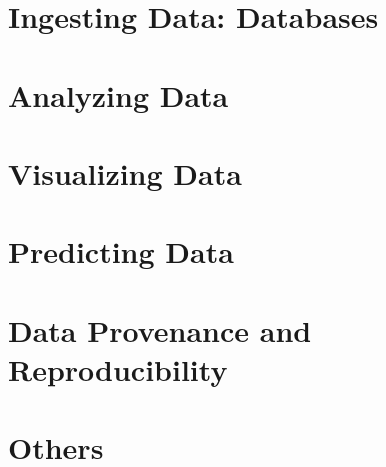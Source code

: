 

\chapter{Ingesting Data: Databases}





\chapter{Analyzing Data}



\chapter{Visualizing Data}





\chapter{Predicting Data}



\chapter{Data Provenance and Reproducibility}




\chapter{Others}





